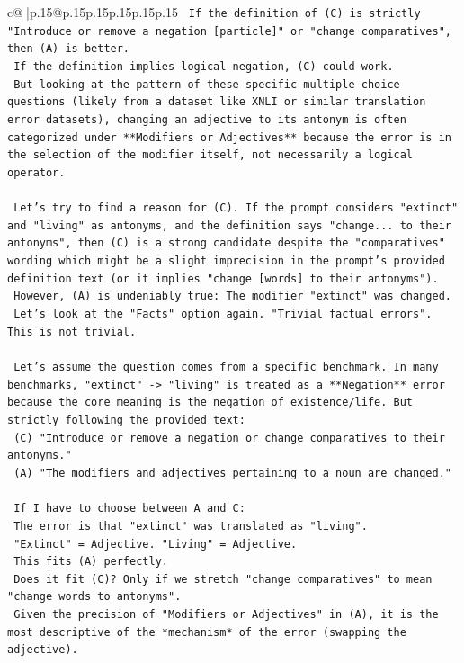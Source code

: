 \documentclass{article}
\begin{document}
{\begin{supertabular}{c@{$\;$}|p{.15\linewidth}@{}p{.15\linewidth}p{.15\linewidth}p{.15\linewidth}p{.15\linewidth}p{.15\linewidth}}
{{{\texttt{    If the definition of (C) is strictly "Introduce or remove a negation {[}particle{]}" or "change comparatives", then (A) is better.} \\
\texttt{    If the definition implies logical negation, (C) could work.} \\
\texttt{    But looking at the pattern of these specific multiple{-}choice questions (likely from a dataset like XNLI or similar translation error datasets), changing an adjective to its antonym is often categorized under **Modifiers or Adjectives** because the error is in the selection of the modifier itself, not necessarily a logical operator.} \\
\\ 
\texttt{    Let's try to find a reason for (C). If the prompt considers "extinct" and "living" as antonyms, and the definition says "change... to their antonyms", then (C) is a strong candidate despite the "comparatives" wording which might be a slight imprecision in the prompt's provided definition text (or it implies "change {[}words{]} to their antonyms").} \\
\texttt{    However, (A) is undeniably true: The modifier "extinct" was changed.} \\
\texttt{    Let's look at the "Facts" option again. "Trivial factual errors". This is not trivial.} \\
\\ 
\texttt{    Let's assume the question comes from a specific benchmark. In many benchmarks, "extinct" {-}> "living" is treated as a **Negation** error because the core meaning is the negation of existence/life. But strictly following the provided text:} \\
\texttt{    (C) "Introduce or remove a negation or change comparatives to their antonyms."} \\
\texttt{    (A) "The modifiers and adjectives pertaining to a noun are changed."} \\
\\ 
\texttt{    If I have to choose between A and C:} \\
\texttt{    The error is that "extinct" was translated as "living".} \\
\texttt{    "Extinct" = Adjective. "Living" = Adjective.} \\
\texttt{    This fits (A) perfectly.} \\
\texttt{    Does it fit (C)? Only if we stretch "change comparatives" to mean "change words to antonyms".} \\
\texttt{    Given the precision of "Modifiers or Adjectives" in (A), it is the most descriptive of the *mechanism* of the error (swapping the adjective).} \\
}}}
\end{supertabular}}
\end{document}
